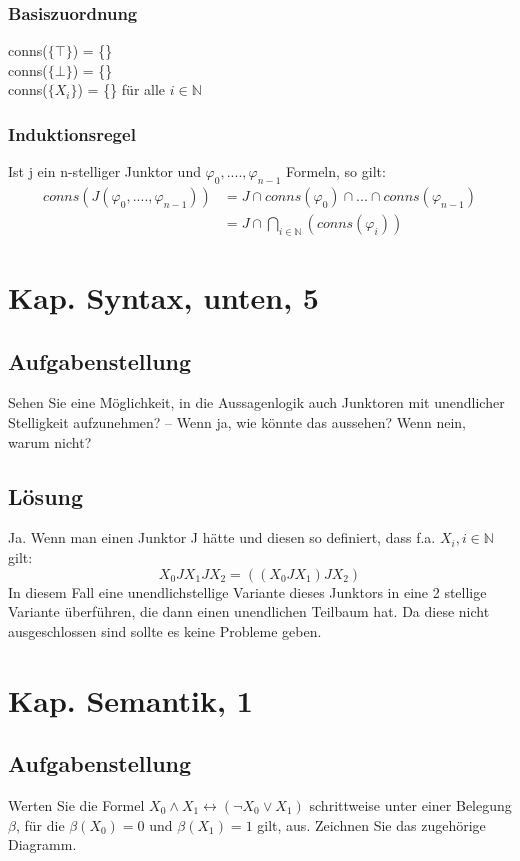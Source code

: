 \documentclass[12pt, a4paper]{article}
\begin{document}
\subsubsection*{Basiszuordnung}
conns($\{ \top \}$) = \{\}\\
conns($\{ \bot \}$) = \{\}\\
conns($\{ X_i \}$) = \{\} für alle $i \in \mathds{N}$
\subsubsection*{Induktionsregel}
Ist j ein n-stelliger Junktor und $\varphi_0,....,\varphi_{n-1}$ Formeln, so gilt:\\
\begin{equation}
\begin{split}
conns(J(\varphi_0,....,\varphi_{n-1})) &= J \cap conns(\varphi_0) \cap ... \cap conns(\varphi_{n-1})\\
&= J \cap \bigcap_{i \in \mathds{N}}(conns(\varphi_i))
\end{split}
\end{equation}

\section*{Kap. Syntax, unten, 5}
\subsection*{Aufgabenstellung}
Sehen Sie eine Möglichkeit, in die Aussagenlogik auch Junktoren mit unendlicher Stelligkeit aufzunehmen? – Wenn ja, wie könnte das aussehen? Wenn nein, warum nicht?
\subsection*{Lösung}
Ja. Wenn man einen Junktor J hätte und diesen so definiert, dass f.a. $X_i, i \in \mathds{N}$ gilt:
\begin{equation}
X_0 J X_1 J X_2 = ((X_0 J X_1) J X_2)
\end{equation}
In diesem Fall eine unendlichstellige Variante dieses Junktors in eine 2 stellige Variante überführen, die dann einen unendlichen Teilbaum hat. Da diese nicht ausgeschlossen sind sollte es keine Probleme geben.

\section*{Kap. Semantik, 1}
\subsection*{Aufgabenstellung}
Werten Sie die Formel $X_0 \wedge X_1 \leftrightarrow (\neg X_0 \vee X_1)$ schrittweise unter einer Belegung $\beta$, für die $\beta(X_0)=0$ und $\beta(X_1)=1$ gilt, aus. Zeichnen Sie das zugehörige Diagramm.
\end{document}
